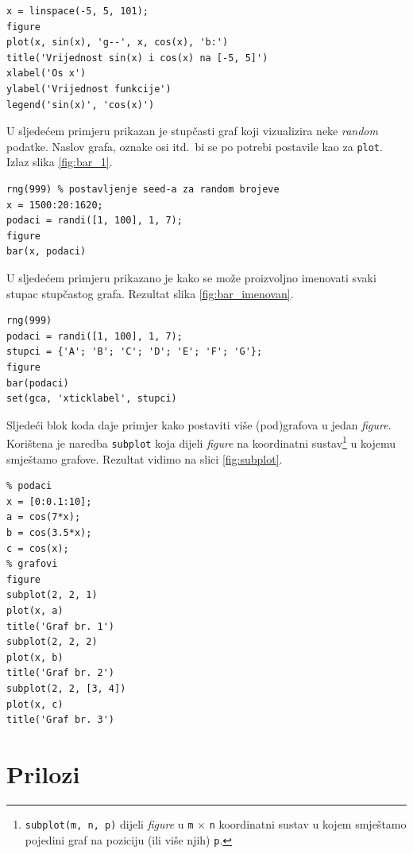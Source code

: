\documentclass[a4paper, 10pt]{article}
\newcommand{\spec}[1]{\texttt{#1}} %
\newcommand{\eng}[1]{\emph{#1}} %
\begin{document}
\begin{lstlisting}
x = linspace(-5, 5, 101);
figure
plot(x, sin(x), 'g--', x, cos(x), 'b:')
title('Vrijednost sin(x) i cos(x) na [-5, 5]')
xlabel('Os x')
ylabel('Vrijednost funkcije')
legend('sin(x)', 'cos(x)')
\end{lstlisting}

U sljedećem primjeru prikazan je stupčasti graf koji vizualizira neke \eng{random} podatke.
Naslov grafa, oznake osi itd.\ bi se po potrebi postavile kao za \spec{plot}.
Izlaz slika \ref{fig:bar_1}.

\begin{lstlisting}
rng(999) % postavljenje seed-a za random brojeve
x = 1500:20:1620;
podaci = randi([1, 100], 1, 7);
figure
bar(x, podaci)
\end{lstlisting}

\pagebreak

U sljedećem primjeru prikazano je kako se može proizvoljno imenovati svaki stupac stupčastog grafa.
Rezultat slika \ref{fig:bar_imenovan}.

\begin{lstlisting}
rng(999)
podaci = randi([1, 100], 1, 7);
stupci = {'A'; 'B'; 'C'; 'D'; 'E'; 'F'; 'G'};
figure
bar(podaci)
set(gca, 'xticklabel', stupci)
\end{lstlisting}

Sljedeći blok koda daje primjer kako postaviti više (pod)grafova u jedan \eng{figure}.
Korištena je naredba \spec{subplot} koja dijeli \eng{figure} na koordinatni sustav\footnote{\spec{subplot(m, n, p)} dijeli \eng{figure} u \spec{m} $\times$ \spec{n} koordinatni sustav u kojem smještamo pojedini graf na poziciju (ili više njih) \spec{p}.} u kojemu smještamo grafove.
Rezultat vidimo na slici \ref{fig:subplot}.

\begin{lstlisting}
% podaci
x = [0:0.1:10];
a = cos(7*x);
b = cos(3.5*x);
c = cos(x);
% grafovi
figure
subplot(2, 2, 1)
plot(x, a)
title('Graf br. 1')
subplot(2, 2, 2)
plot(x, b)
title('Graf br. 2')
subplot(2, 2, [3, 4])
plot(x, c)
title('Graf br. 3')
\end{lstlisting}

\clearpage


\section*{Prilozi}
\label{sec:prilozi}
\end{document}
